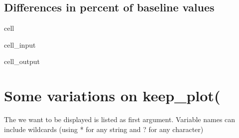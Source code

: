 \documentclass[letterpaper,10pt,english]{jupyterBook}
\begin{document}
\subsection{Differences in percent of baseline values}
\label{\detokenize{content/howto/experiments/Standard experiment simple:differences-in-percent-of-baseline-values}}
\begin{sphinxuseclass}{cell}\begin{sphinxVerbatimInput}

\begin{sphinxuseclass}{cell_input}
\begin{sphinxVerbatim}[commandchars=\\\{\}]
\end{sphinxVerbatim}

\end{sphinxuseclass}\end{sphinxVerbatimInput}
\begin{sphinxVerbatimOutput}

\begin{sphinxuseclass}{cell_output}
\noindent{}

\noindent{}

\end{sphinxuseclass}\end{sphinxVerbatimOutput}

\end{sphinxuseclass}

\section{Some variations on keep\_plot(}
\label{\detokenize{content/howto/experiments/Standard experiment simple:some-variations-on-keep-plot}}
\sphinxAtStartPar
The  we want to be displayed is listed as first argument. Variable names can include
wildcards (using * for any string and ? for any character)
\end{document}
